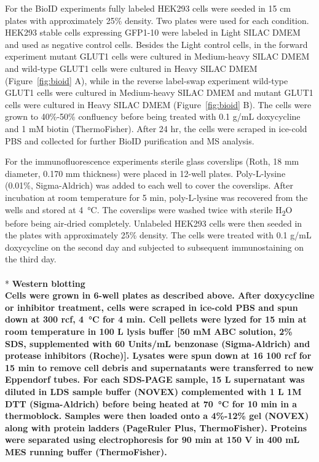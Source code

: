 For the BioID experiments fully labeled HEK293 cells were seeded in 15 cm plates with approximately 25\% density. Two plates were used for each condition. HEK293 stable cells expressing GFP1-10 were labeled in Light SILAC DMEM and used as negative control cells. Besides the Light control cells, in the forward experiment mutant GLUT1 cells were cultured in Medium-heavy SILAC DMEM and wild-type GLUT1 cells were cultured in Heavy SILAC DMEM (Figure~\ref{fig:bioid} A), while in the reverse label-swap experiment wild-type GLUT1 cells were cultured in Medium-heavy SILAC DMEM and mutant GLUT1 cells were cultured in Heavy SILAC DMEM (Figure~\ref{fig:bioid} B). The cells were grown to 40\%-50\% confluency before being treated with 0.1 {}\textmu g/mL doxycycline and 1 mM biotin (ThermoFisher). After 24 hr, the cells were scraped in ice-cold PBS and collected for further BioID purification and MS analysis.

For the immunofluorescence experiments sterile glass coverslips (Roth, 18 mm diameter, 0.170 mm thickness) were placed in 12-well plates. Poly-L-lysine (0.01\%, Sigma-Aldrich) was added to each well to cover the coverslips. After incubation at room temperature for 5 min, poly-L-lysine was recovered from the wells and stored at \SI{4}{\celsius}. The coverslips were washed twice with sterile H\textsubscript{2}O before being air-dried completely. Unlabeled HEK293 cells were then seeded in the plates with approximately 25\% density. The cells were treated with 0.1 {}\textmu g/mL doxycycline on the second day and subjected to subsequent immunostaining on the third day.
\\
\\*
\bfseries{Western blotting}\\
\normalfont Cells were grown in 6-well plates as described above. After doxycycline or inhibitor treatment, cells were scraped in ice-cold PBS and spun down at 300 rcf, \SI{4}{\celsius} for 4 min. Cell pellets were lyzed for 15 min at room temperature in 100 \textmu L lysis buffer [50 mM ABC solution, 2\% SDS, supplemented with 60 Units/mL benzonase (Sigma-Aldrich) and protease inhibitors (Roche)]. Lysates were spun down at 16 100 rcf for 15 min to remove cell debris and supernatants were transferred to new Eppendorf tubes. For each SDS-PAGE sample, 15 {}\textmu L supernatant was diluted in LDS sample buffer (NOVEX) complemented with 1 {}\textmu L 1M DTT (Sigma-Aldrich) before being heated at \SI{70}{\celsius} for 10 min in a thermoblock. Samples were then loaded onto a 4\%-12\% gel (NOVEX) along with protein ladders (PageRuler Plus, ThermoFisher). Proteins were separated using electrophoresis for 90 min at 150 V in 400 mL MES running buffer (ThermoFisher). 

